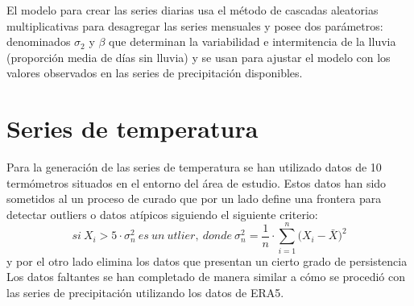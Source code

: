 

El modelo para crear las series diarias usa el método de cascadas aleatorias multiplicativas \cite{Molnar} para 
desagregar las series mensuales y posee dos parámetros: denominados $\sigma_2$ y $\beta$
que determinan la variabilidad e intermitencia de la lluvia (proporción media de días sin lluvia) y se usan para 
ajustar el modelo con los valores observados en las series de precipitación disponibles.




\section{Series de temperatura}
\label{tempint}
Para la generación de las series de temperatura se han utilizado datos de 10 termómetros situados en el entorno del área de 
estudio.
Estos datos han sido sometidos al un proceso de curado que por un lado define una frontera para detectar outliers o datos
 atípicos siguiendo el siguiente criterio:
\begin{equation}
  si~X_i>5\cdot\sigma^2_n~es~un~utlier,~donde~\sigma^2_n=\frac{1}{n}\cdot\sum^n_{i=1}\bigg(X_i-\bar{X}\bigg)^2
\end{equation}
y por el otro lado elimina los datos que presentan un cierto grado de persistencia \cite{Estevez}
Los datos faltantes se han completado de manera similar a cómo se procedió con las series 
de precipitación utilizando los datos de ERA5.


